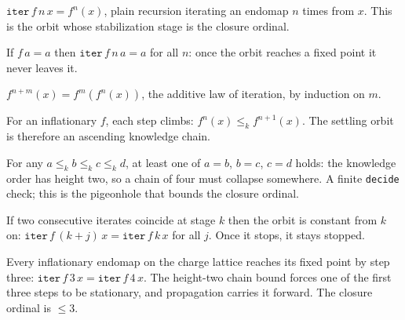 \begin{definition}\label{def:iter}\leanok{}
$\texttt{iter}\,f\,n\,x = f^n(x)$, plain recursion iterating an endomap $n$ times
from $x$. This is the orbit whose stabilization stage is the closure ordinal.
\end{definition}

\begin{theorem}\label{thm:iter-fixed-of}\leanok{}
If $f\,a = a$ then $\texttt{iter}\,f\,n\,a = a$ for all $n$: once the orbit
reaches a fixed point it never leaves it.
\end{theorem}

\begin{theorem}\label{thm:iter-add}\leanok{}
$f^{n+m}(x) = f^m(f^n(x))$, the additive law of iteration, by induction on $m$.
\end{theorem}

\begin{theorem}\label{thm:iter-step-le}\leanok{}
For an inflationary $f$, each step climbs: $f^n(x) \le_k f^{n+1}(x)$. The
settling orbit is therefore an ascending knowledge chain.
\end{theorem}

\begin{theorem}\label{thm:kchain-height}\leanok{}
For any $a \le_k b \le_k c \le_k d$, at least one of $a=b$, $b=c$, $c=d$ holds:
the knowledge order has height two, so a chain of four must collapse somewhere.
A finite \texttt{decide} check; this is the pigeonhole that bounds the closure
ordinal.
\end{theorem}

\begin{theorem}\label{thm:iter-propagate}\leanok{}
If two consecutive iterates coincide at stage $k$ then the orbit is constant
from $k$ on: $\texttt{iter}\,f\,(k+j)\,x = \texttt{iter}\,f\,k\,x$ for all $j$.
Once it stops, it stays stopped.
\end{theorem}

\begin{theorem}[Strict-finite termination: $f^3 = f^4$]\label{thm:settles-by-three}\leanok{}
Every inflationary endomap on the charge lattice reaches its fixed point by step
three: $\texttt{iter}\,f\,3\,x = \texttt{iter}\,f\,4\,x$. The height-two chain
bound forces one of the first three steps to be stationary, and propagation
carries it forward. The closure ordinal is $\le 3$.
\end{theorem}

